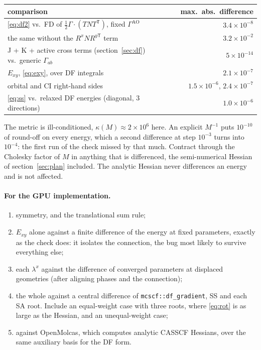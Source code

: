 \documentclass[11pt]{article}
\newcommand{\code}[1]{\texttt{#1}}
\begin{document}
\begin{center}
\begin{tabular}{@{}lr@{}}
\toprule
comparison & max.\ abs.\ difference \\
\midrule
\eqref{eq:df2} vs.\ FD of $\frac12\Gamma\cdot(TNT^{\mathsf T})$, fixed $\Gamma^{\mathrm{AO}}$ & $3.4\times10^{-8}$ \\
\quad the same without the $R^xNR^{y\mathsf T}$ term & $3.2\times10^{-2}$ \\
J + K + active cross terms (section~\ref{sec:df}) vs.\ generic $\Gamma_{ab}$ & $5\times10^{-14}$ \\
$E_{xy}$, \eqref{eq:exy}, over DF integrals & $2.1\times10^{-7}$ \\
orbital and CI right-hand sides & $1.5\times10^{-6}$, $2.4\times10^{-7}$ \\
\eqref{eq:ss} vs.\ relaxed DF energies (diagonal, 3 directions) & $1.0\times10^{-6}$ \\
\bottomrule
\end{tabular}
\end{center}

\noindent The metric is ill-conditioned, $\kappa(M)\approx2\times10^{6}$
here. An explicit $M^{-1}$ puts $10^{-10}$ of round-off on every energy,
which a second difference at step $10^{-3}$ turns into $10^{-4}$: the first
run of the check missed by that much. Contract through the Cholesky factor
of $M$ in anything that is differenced, the semi-numerical Hessian of
section~\ref{sec:plan} included. The analytic Hessian never differences an
energy and is not affected.

\paragraph{For the GPU implementation.}
\begin{enumerate}
  \item symmetry, and the translational sum rule;
  \item $E_{xy}$ alone against a finite difference of the energy at fixed
        parameters, exactly as the check does: it isolates the
        connection, the bug most likely to survive everything else;
  \item each $\lambda^x$ against the difference of converged parameters
        at displaced geometries (after aligning phases and the connection);
  \item the whole against a central difference of \code{mcscf::df\_gradient},
        SS and each SA root. Include an equal-weight case with three roots,
        where \eqref{eq:rot} is as large as the Hessian, and an unequal-weight
        case;
  \item against OpenMolcas, which computes analytic CASSCF Hessians, over
        the same auxiliary basis for the DF form.
\end{enumerate}
\end{document}
